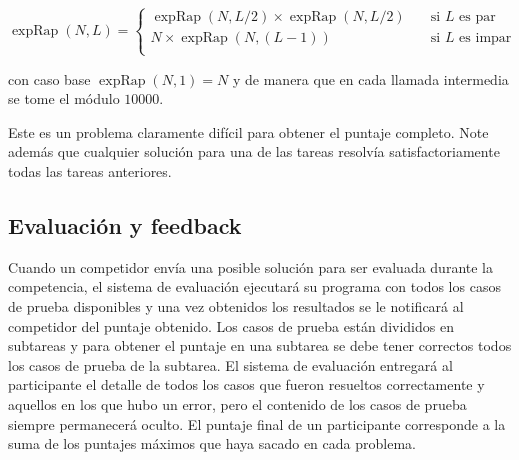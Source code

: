 \begin{description}
\[
\operatorname{expRap}(N,L) =
     \begin{cases}
       \operatorname{expRap}(N,{L}/{2}) \times
\operatorname{expRap}(N,{L}/{2}) &\quad\text{si $L$ es par}\\
       N\times \operatorname{expRap}(N,{(L-1)}) &\quad\text{si $L$ es impar}\\
     \end{cases}
\]


con caso base $\operatorname{expRap}(N,1)=N$ y de manera que en cada llamada intermedia
se tome el módulo $10000$.

\end{description}
Este es un problema claramente difícil para obtener el puntaje completo.
Note además que cualquier solución para una de las tareas resolvía satisfactoriamente todas
las tareas anteriores.

\subsection{Evaluación y feedback}

Cuando un competidor envía una posible solución para ser evaluada durante la competencia,
el sistema de evaluación ejecutará su programa con todos los casos de prueba disponibles
y una vez obtenidos los resultados se le notificará al competidor del puntaje obtenido.
Los casos de prueba están divididos en subtareas y para obtener el puntaje en
una subtarea se debe tener correctos todos los casos de prueba de la subtarea.
El sistema de evaluación entregará al participante el detalle de todos los casos
que fueron resueltos correctamente y aquellos en los que hubo un error, pero el
contenido de los casos de prueba siempre permanecerá oculto.
El puntaje final de un participante corresponde a la suma de los puntajes máximos que haya sacado en cada problema.

